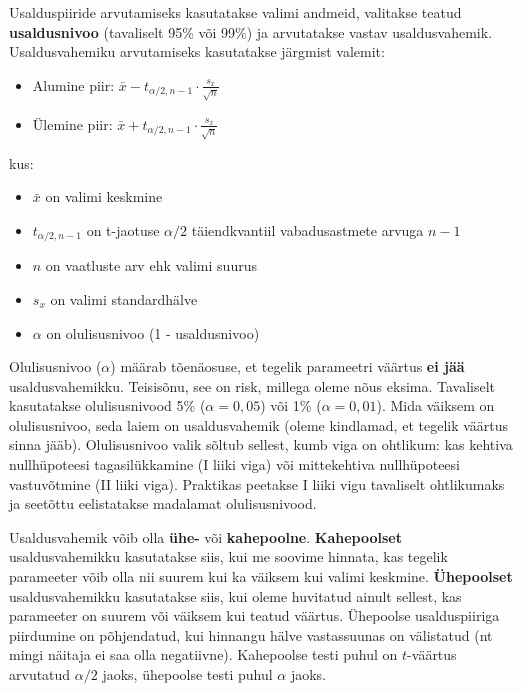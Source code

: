\documentclass[
]{book}
\providecommand{\tightlist}{%
  \setlength{\itemsep}{0pt}\setlength{\parskip}{0pt}}
\theoremstyle{definition}
\theoremstyle{definition}
\theoremstyle{definition}
\theoremstyle{definition}
\theoremstyle{remark}
\begin{document}
Usalduspiiride arvutamiseks kasutatakse valimi andmeid, valitakse teatud \textbf{usaldusnivoo} (tavaliselt 95\% või 99\%) ja arvutatakse vastav usaldusvahemik. Usaldusvahemiku arvutamiseks kasutatakse järgmist valemit:

\begin{itemize}
\tightlist
\item
  Alumine piir: \(\bar{x} - t_{\alpha/2, n-1} \cdot \frac{s_x}{\sqrt{n}}\)
\item
  Ülemine piir: \(\bar{x} + t_{\alpha/2, n-1} \cdot \frac{s_x}{\sqrt{n}}\)
\end{itemize}

kus:

\begin{itemize}
\tightlist
\item
  \(\bar{x}\) on valimi keskmine
\item
  \(t_{\alpha/2, n-1}\) on t-jaotuse \(\alpha/2\) täiendkvantiil vabadusastmete arvuga \(n-1\)
\item
  \(n\) on vaatluste arv ehk valimi suurus
\item
  \(s_x\) on valimi standardhälve
\item
  \(\alpha\) on olulisusnivoo (1 - usaldusnivoo)
\end{itemize}

Olulisusnivoo (\(\alpha\)) määrab tõenäosuse, et tegelik parameetri väärtus \textbf{ei jää} usaldusvahemikku. Teisisõnu, see on risk, millega oleme nõus eksima. Tavaliselt kasutatakse olulisusnivood 5\% (\(\alpha = 0,05\)) või 1\% (\(\alpha = 0,01\)). Mida väiksem on olulisusnivoo, seda laiem on usaldusvahemik (oleme kindlamad, et tegelik väärtus sinna jääb). Olulisusnivoo valik sõltub sellest, kumb viga on ohtlikum: kas kehtiva nullhüpoteesi tagasilükkamine (I liiki viga) või mittekehtiva nullhüpoteesi vastuvõtmine (II liiki viga). Praktikas peetakse I liiki vigu tavaliselt ohtlikumaks ja seetõttu eelistatakse madalamat olulisusnivood.

Usaldusvahemik võib olla \textbf{ühe-} või \textbf{kahepoolne}. \textbf{Kahepoolset} usaldusvahemikku kasutatakse siis, kui me soovime hinnata, kas tegelik parameeter võib olla nii suurem kui ka väiksem kui valimi keskmine. \textbf{Ühepoolset} usaldusvahemikku kasutatakse siis, kui oleme huvitatud ainult sellest, kas parameeter on suurem või väiksem kui teatud väärtus. Ühepoolse usalduspiiriga piirdumine on põhjendatud, kui hinnangu hälve vastassuunas on välistatud (nt mingi näitaja ei saa olla negatiivne). Kahepoolse testi puhul on \(t\)-väärtus arvutatud \(\alpha/2\) jaoks, ühepoolse testi puhul \(\alpha\) jaoks.
\end{document}
